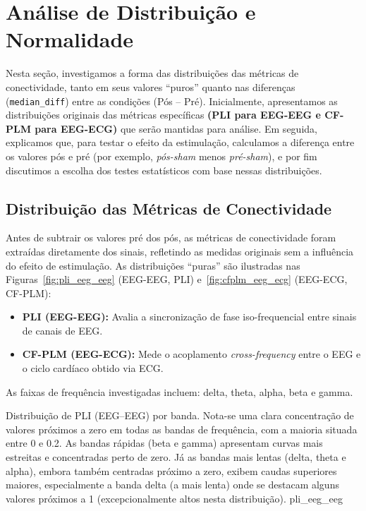 \chapter{Análise de Distribuição e Normalidade}
\label{chap:analise_distribuicao_normalidade}
Nesta seção, investigamos a forma das distribuições das métricas de conectividade, tanto em seus valores ``puros'' quanto nas diferenças (\texttt{median\_diff}) entre as condições (Pós – Pré). Inicialmente, apresentamos as distribuições originais das métricas específicas \textbf{(PLI para EEG-EEG e CF-PLM para EEG-ECG)} que serão mantidas para análise. Em seguida, explicamos que, para testar o efeito da estimulação, calculamos a diferença entre os valores pós e pré (por exemplo, \emph{pós-sham} menos \emph{pré-sham}), e por fim discutimos a escolha dos testes estatísticos com base nessas distribuições.

\section{Distribuição das Métricas de Conectividade}
Antes de subtrair os valores pré dos pós, as métricas de conectividade foram extraídas diretamente dos sinais, refletindo as medidas originais sem a influência do efeito de estimulação. As distribuições ``puras'' são ilustradas nas Figuras~\ref{fig:pli_eeg_eeg} (EEG-EEG, PLI) e~\ref{fig:cfplm_eeg_ecg} (EEG-ECG, CF-PLM):
\begin{itemize}
    \item \textbf{PLI (EEG-EEG):} Avalia a sincronização de fase iso-frequencial entre sinais de canais de EEG.
    \item \textbf{CF-PLM (EEG-ECG):} Mede o acoplamento \textit{cross-frequency} entre o EEG e o ciclo cardíaco obtido via ECG.
\end{itemize}

As faixas de frequência investigadas incluem: delta, theta, alpha, beta e gamma.


{Distribuição de PLI (EEG–EEG) por banda. Nota-se uma clara concentração de valores próximos a zero em todas as bandas de frequência, com a maioria situada entre 0 e 0.2. As bandas rápidas (beta e gamma) apresentam curvas mais estreitas e concentradas perto de zero. Já as bandas mais lentas (delta, theta e alpha), embora também centradas próximo a zero, exibem caudas superiores maiores, especialmente a banda delta (a mais lenta) onde se destacam alguns valores próximos a 1 (excepcionalmente altos nesta distribuição).}
{pli_eeg_eeg}


